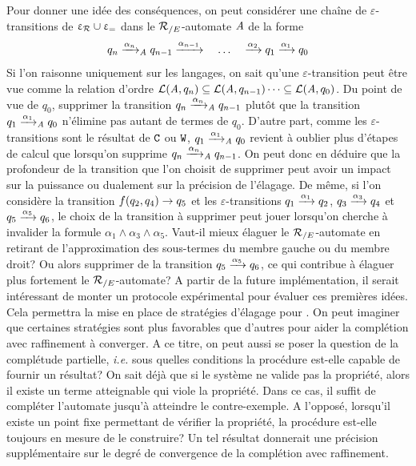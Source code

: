 Pour donner une idée des conséquences, on peut considérer une chaîne de $\varepsilon$-transitions
de $\upvarepsilon_{\mathcal R} \cup \upvarepsilon_{=}$ dans le ${\mathcal R_{/E}}$-automate $\mathit A$ de la forme
\[q_n \xrightarrow{\alpha_n}_\mathit A q_{n-1} \xrightarrow{\alpha_{n-1}} \quad \dots \quad \xrightarrow{\alpha_2} q_1 \xrightarrow{\alpha_1} q_0\]
Si l'on raisonne uniquement sur les langages, on sait qu'une $\varepsilon$-transition peut être vue comme
la relation d'ordre $\mathcal{L}(\mathit A,q_n) \subseteq \mathcal{L}(\mathit A,q_{n-1}) \dots \subseteq \mathcal{L}(\mathit A,q_0)$.
Du point de vue de $q_0$, supprimer la transition $q_n \xrightarrow{\alpha_n}_\mathit A q_{n-1}$ plutôt que la transition
$q_1 \xrightarrow{\alpha_1}_\mathit A q_0$ n'élimine pas autant de termes de $q_0$. D'autre part, comme les $\varepsilon$-transitions 
sont le résultat de $\mathtt{C}$ ou $\mathtt{W}$, $q_1 \xrightarrow{\alpha_1}_\mathit A q_{0}$ revient à oublier plus d'étapes de calcul
que lorsqu'on supprime $q_n \xrightarrow{\alpha_n}_\mathit A q_{n-1}$. On peut donc en déduire que la profondeur de la transition
que l'on choisit de supprimer peut avoir un impact sur la puissance ou dualement sur la précision de l'élagage.
De même, si l'on considère la transition $f(q_2,q_4) \rightarrow q_5$ et les $\varepsilon$-transitions $q_1 \xrightarrow{\alpha_1} q_2$,
$q_3 \xrightarrow{\alpha_3} q_4$ et $q_5 \xrightarrow{\alpha_5} q_6$, le choix de la transition à supprimer peut jouer lorsqu'on
cherche à invalider la formule $\alpha_1 \land \alpha_3 \land \alpha_5$. Vaut-il mieux élaguer le ${\mathcal R_{/E}}$-automate 
en retirant de l'approximation des sous-termes du membre gauche ou du membre droit? Ou alors supprimer de la transition
$q_5 \xrightarrow{\alpha_5} q_6$, ce qui contribue à élaguer plus fortement le ${\mathcal R_{/E}}$-automate?
A partir de la future implémentation, il serait intéressant de monter un protocole expérimental pour évaluer 
ces premières idées. Cela permettra la mise en place de stratégies d'élagage pour \timbuk.
On peut imaginer que certaines stratégies sont plus favorables que d'autres pour aider la complétion
avec raffinement à converger.
A ce titre, on peut aussi se poser la question de la complétude partielle, \textit{i.e.} sous quelles conditions la procédure
est-elle capable de fournir un résultat? On sait déjà que si le système ne valide pas la propriété, alors il existe un terme atteignable
qui viole la propriété. Dans ce cas, il suffit de compléter l'automate jusqu'à atteindre le contre-exemple.
A l'opposé, lorsqu'il existe un point fixe permettant de vérifier la propriété, la procédure est-elle toujours en mesure
de le construire? Un tel résultat donnerait une précision supplémentaire sur le degré de convergence de la complétion avec raffinement.








